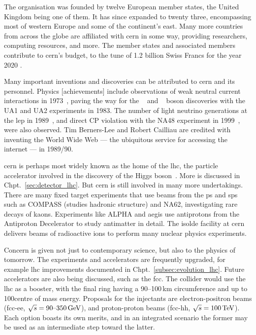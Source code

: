 The organisation was founded by twelve European member states, the United Kingdom being one of them. It has since expanded to twenty three, encompassing most of western Europe and some of the continent's east. Many more countries from across the globe are affiliated with \acrshort{cern} in some way, providing researchers, computing resources, and more. The member states and associated members contribute to \acrshort{cern}'s budget, to the tune of 1.2 billion Swiss Francs for the year 2020 \cite{cern_budget_2020}.

Many important inventions and discoveries can be attributed to \acrshort{cern} and its personnel. Physics [achievements] include observations of weak neutral current interactions in 1973~\cite{HASERT1973121,HASERT1973138}, paving the way for the \PW~\cite{ARNISON1983103,BANNER1983476} and \PZ~\cite{Arnison:1983mk,Bagnaia:1983zx} boson discoveries with the UA1 and UA2 experiments in 1983. The number of light neutrino generations at the \acrfull{lep} in 1989~\cite{Trentadue:200667}, and direct CP violation with the NA48 experiment in 1999~\cite{Fanti_1999}, were also observed. Tim Berners-Lee and Robert Cailliau are credited with inventing the World Wide Web --- the ubiquitous service for accessing the internet --- in 1989/90.

\acrshort{cern} is perhaps most widely known as the home of the \acrlong{lhc}, the particle accelerator involved in the discovery of the Higgs boson~\cite{Chatrchyan:2012xdj,Aad:2012tfa}. More is discussed in Chpt.~\ref{sec:detector_lhc}. But \acrshort{cern} is still involved in many more undertakings. There are many fixed target experiments that use beams from the \acrshort{ps} and \acrshort{sps} such as COMPASS (studies hadronic structure) and NA62, investigating rare decays of kaons. Experiments like ALPHA and \acrshort{aegis} use antiprotons from the Antiproton Decelerator to study antimatter in detail. The \acrshort{isolde} facility at \acrshort{cern} delivers beams of radioactive ions to perform many nuclear physics experiments.

Concern is given not just to contemporary science, but also to the physics of tomorrow. The experiments and accelerators are frequently upgraded, for example \acrshort{lhc} improvements documented in Chpt.~\ref{subsec:evolution_lhc}. Future accelerators are also being discussed, such as the \acrfull{fcc}. The collider would use the \acrshort{lhc} as a booster, with the final ring having a 90--100\,km circumference and up to 100\TeV centre of mass energy. Proposals for the injectants are electron-positron beams (\acrshort{fcc}-ee, $\sqrt{s} = \text{90--350}\,\text{Ge\hspace{-.08em}V}$), and proton-proton beams (\acrshort{fcc}-hh, $\sqrt{s} = \text{100}\,\text{Te\hspace{-.08em}V}$). Each option boasts its own merits, and in an integrated scenario the former may be used as an intermediate step toward the latter.


